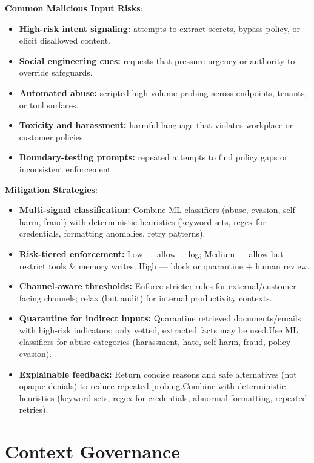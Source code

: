 \begin{TNtwocol}
    \textbf{Common Malicious Input Risks}:
    \begin{itemize}
        \item \textbf{High-risk intent signaling:} attempts to extract secrets, bypass policy, or elicit disallowed content.
        \item \textbf{Social engineering cues:} requests that pressure urgency or authority to override safeguards.
        \item \textbf{Automated abuse:} scripted high-volume probing across endpoints, tenants, or tool surfaces.
        \item \textbf{Toxicity and harassment:} harmful language that violates workplace or customer policies.
        \item \textbf{Boundary-testing prompts:} repeated attempts to find policy gaps or inconsistent enforcement.
    \end{itemize}

    \textbf{Mitigation Strategies}:
    \begin{itemize}
        \item \textbf{Multi-signal classification:} Combine ML classifiers (abuse, evasion, self-harm, fraud) with deterministic heuristics (keyword sets, regex for credentials, formatting anomalies, retry patterns).
        \item \textbf{Risk-tiered enforcement:} Low — allow + log; Medium — allow but restrict tools & memory writes; High — block or quarantine + human review.
        \item \textbf{Channel-aware thresholds:} Enforce stricter rules for external/customer-facing channels; relax (but audit) for internal productivity contexts.
        \item \textbf{Quarantine for indirect inputs:} Quarantine retrieved documents/emails with high-risk indicators; only vetted, extracted facts may be used.Use ML classifiers for abuse categories (harassment, hate, self-harm, fraud, policy evasion).
        \item \textbf{Explainable feedback:} Return concise reasons and safe alternatives (not opaque denials) to reduce repeated probing.Combine with deterministic heuristics (keyword sets, regex for credentials, abnormal formatting, repeated retries).
    \end{itemize}

    \section{Context Governance}


\end{TNtwocol}
